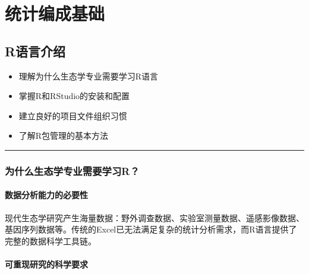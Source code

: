 \documentclass[
]{book}
\providecommand{\tightlist}{%
  \setlength{\itemsep}{0pt}\setlength{\parskip}{0pt}}
\begin{document}
\hypertarget{ux7edfux8ba1ux7f16ux6210ux57faux7840}{%
\chapter{统计编成基础}\label{ux7edfux8ba1ux7f16ux6210ux57faux7840}}

\hypertarget{rux8bedux8a00ux4ecbux7ecd}{%
\section{R语言介绍}\label{rux8bedux8a00ux4ecbux7ecd}}

\begin{itemize}
\tightlist
\item
  理解为什么生态学专业需要学习R语言
\item
  掌握R和RStudio的安装和配置
\item
  建立良好的项目文件组织习惯
\item
  了解R包管理的基本方法
\end{itemize}

\begin{center}\rule{0.5\linewidth}{0.5pt}\end{center}

\hypertarget{ux4e3aux4ec0ux4e48ux751fux6001ux5b66ux4e13ux4e1aux9700ux8981ux5b66ux4e60r}{%
\subsection{为什么生态学专业需要学习R？}\label{ux4e3aux4ec0ux4e48ux751fux6001ux5b66ux4e13ux4e1aux9700ux8981ux5b66ux4e60r}}

\hypertarget{ux6570ux636eux5206ux6790ux80fdux529bux7684ux5fc5ux8981ux6027}{%
\subsubsection{数据分析能力的必要性}\label{ux6570ux636eux5206ux6790ux80fdux529bux7684ux5fc5ux8981ux6027}}

现代生态学研究产生海量数据：野外调查数据、实验室测量数据、遥感影像数据、基因序列数据等。传统的Excel已无法满足复杂的统计分析需求，而R语言提供了完整的数据科学工具链。

\hypertarget{ux53efux91cdux73b0ux7814ux7a76ux7684ux79d1ux5b66ux8981ux6c42}{%
\subsubsection{可重现研究的科学要求}\label{ux53efux91cdux73b0ux7814ux7a76ux7684ux79d1ux5b66ux8981ux6c42}}
\end{document}
